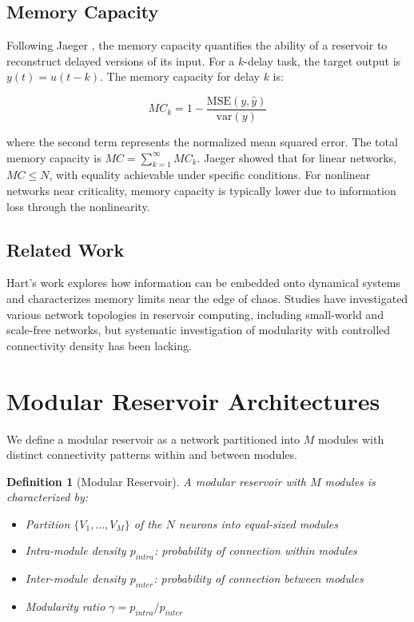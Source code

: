 \documentclass{article}
\newtheorem{definition}{Definition}
\begin{document}
\subsection{Memory Capacity}

Following Jaeger \cite{jaeger2001short}, the memory capacity quantifies the ability of a reservoir to reconstruct delayed versions of its input. For a $k$-delay task, the target output is $y(t) = u(t-k)$. The memory capacity for delay $k$ is:

\begin{equation}
MC_k = 1 - \frac{\text{MSE}(y, \hat{y})}{\text{var}(y)}
\end{equation}

where the second term represents the normalized mean squared error. The total memory capacity is $MC = \sum_{k=1}^{\infty} MC_k$. Jaeger showed that for linear networks, $MC \leq N$, with equality achievable under specific conditions. For nonlinear networks near criticality, memory capacity is typically lower due to information loss through the nonlinearity.

\subsection{Related Work}

Hart's work \cite{hart2021thesis, hart2022memory} explores how information can be embedded onto dynamical systems and characterizes memory limits near the edge of chaos. Studies have investigated various network topologies in reservoir computing, including small-world \cite{watts1998collective} and scale-free networks, but systematic investigation of modularity with controlled connectivity density has been lacking.

\section{Modular Reservoir Architectures}

We define a modular reservoir as a network partitioned into $M$ modules with distinct connectivity patterns within and between modules.

\begin{definition}[Modular Reservoir]
A modular reservoir with $M$ modules is characterized by:
\begin{itemize}
\item Partition $\{V_1, \ldots, V_M\}$ of the $N$ neurons into equal-sized modules
\item Intra-module density $p_{intra}$: probability of connection within modules
\item Inter-module density $p_{inter}$: probability of connection between modules
\item Modularity ratio $\gamma = p_{intra} / p_{inter}$
\end{itemize}
\end{definition}
\end{document}
